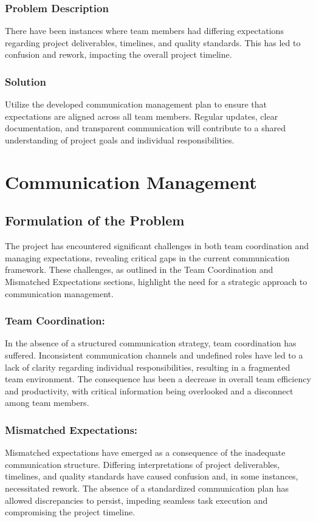 \documentclass[12pt,titlepage,a4paper]{report}
\begin{document}
        \subsection{Problem Description}
        There have been instances where team members had differing expectations regarding project deliverables, timelines, and quality standards. This has led to confusion and rework, impacting the overall project timeline.
        \subsection{Solution}
        Utilize the developed communication management plan to ensure that expectations are aligned across all team members. Regular updates, clear documentation, and transparent communication will contribute to a shared understanding of project goals and individual responsibilities.
\chapter{Communication Management}
    \section{Formulation of the Problem}
    The project has encountered significant challenges in both team coordination and managing expectations, revealing critical gaps in the current communication framework. These challenges, as outlined in the Team Coordination and Mismatched Expectations sections, highlight the need for a strategic approach to communication management.
        \subsection{Team Coordination:}
        In the absence of a structured communication strategy, team coordination has suffered. Inconsistent communication channels and undefined roles have led to a lack of clarity regarding individual responsibilities, resulting in a fragmented team environment. The consequence has been a decrease in overall team efficiency and productivity, with critical information being overlooked and a disconnect among team members.
        \subsection{Mismatched Expectations:}
        Mismatched expectations have emerged as a consequence of the inadequate communication structure. Differing interpretations of project deliverables, timelines, and quality standards have caused confusion and, in some instances, necessitated rework. The absence of a standardized communication plan has allowed discrepancies to persist, impeding seamless task execution and compromising the project timeline.
\end{document}
